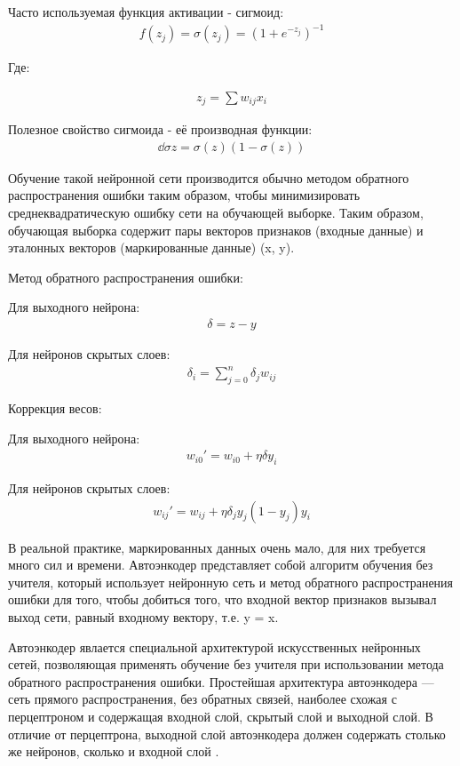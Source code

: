 \documentclass[12pt]{article}
\begin{document}
Часто используемая функция активации - сигмоид:
  \begin{align}
	f(z_j)=\sigma(z_j)=(1+e^{-z_j})^{-1}
  \end{align}

Где:

  \begin{align}
	z_j=\sum{{w_{ij}}{x_i}}
  \end{align}

Полезное свойство сигмоида - её производная функции:
  \begin{align}
	\dd{\sigma}z=\sigma(z)(1-\sigma(z))
  \end{align}

Обучение такой нейронной сети производится обычно методом обратного распространения ошибки таким образом, чтобы минимизировать среднеквадратическую ошибку сети на обучающей выборке. Таким образом, обучающая выборка содержит пары векторов признаков (входные данные) и эталонных векторов (маркированные данные) {(x, y)}.

Метод обратного распространения ошибки:

Для выходного нейрона:
  \begin{align}
	\delta=z-y
  \end{align}

Для нейронов скрытых слоев:
  \begin{align}
	\delta_i=\sum_{j=0}^n \delta_j w_{ij}
  \end{align}

Коррекция весов:

Для выходного нейрона:
  \begin{align}
	w_{i0}'=w_{i0}+\eta\delta y_i
  \end{align}

Для нейронов скрытых слоев:
  \begin{align}
	w_{ij}'=w_{ij}+\eta\delta_j y_j(1-y_j)y_i
  \end{align}

В реальной практике, маркированных данных очень мало, для них требуется много сил и времени. Автоэнкодер представляет собой алгоритм обучения без учителя, который использует нейронную сеть и метод обратного распространения ошибки для того, чтобы добиться того, что входной вектор признаков вызывал выход сети, равный входному вектору, т.е. y = x.

Автоэнкодер явлается специальной архитектурой искусственных нейронных сетей, позволяющая применять обучение без учителя при использовании метода обратного распространения ошибки. Простейшая архитектура автоэнкодера — сеть прямого распространения, без обратных связей, наиболее схожая с перцептроном и содержащая входной слой, скрытый слой и выходной слой. В отличие от перцептрона, выходной слой автоэнкодера должен содержать столько же нейронов, сколько и входной слой \cite{Stanford2}.
\end{document}
